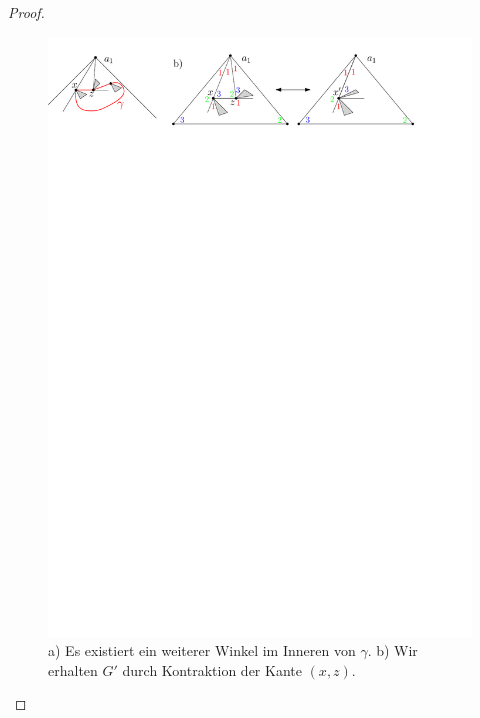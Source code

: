 \begin{proof}
\begin{description}[leftmargin =0pt, font = \bfseries]
\begin{figure}[h]
\centering
\includegraphics[width=1\textwidth]{lem5_3.pdf}
\caption{a) Es existiert ein weiterer Winkel im Inneren von $\gamma$. b) Wir erhalten $G'$ durch Kontraktion der Kante $(x,z)$.}
\label{pic_lem5_3}
\end{figure}


\end{description}
\end{proof}

